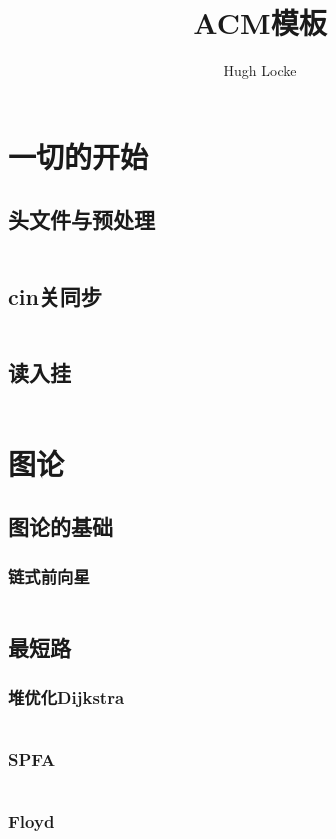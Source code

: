 \documentclass[a4paper,11pt]{article}
\author{Hugh Locke}
\title{ACM模板}
\begin{document}
 
\maketitle %
\newpage %

\tableofcontents %
\newpage
\section{一切的开始} 
\subsection{头文件与预处理} 
\inputminted[breaklines]{c++}{其他/start.cpp}
\subsection{cin关同步}
\inputminted[breaklines]{c++}{其他/cin关同步.cpp}
\subsection{读入挂}
\inputminted[breaklines]{c++}{其他/读入挂.cpp}

\section{图论}

\subsection{图论的基础}
\subsubsection{链式前向星}
\inputminted[breaklines]{c++}{图论/init.cpp}
\subsection{最短路}
\subsubsection{堆优化Dijkstra}
\inputminted[breaklines]{c++}{图论/Dijkstra.cpp}
\subsubsection{SPFA}
\inputminted[breaklines]{c++}{图论/SPFA.cpp}
\subsubsection{Floyd}
\inputminted[breaklines]{c++}{图论/Floyd.cpp}
\end{document}
